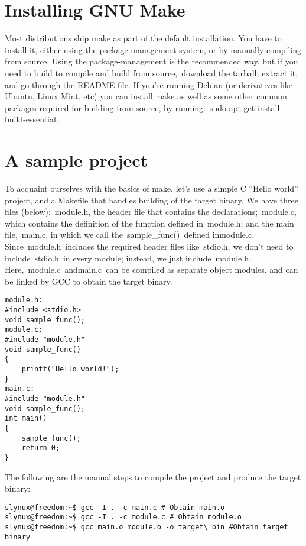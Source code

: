 \documentclass[output=paper, 
colorlinks,
citecolor=brown,
newtxmath
]{langscibook}
\begin{document}
\section {Installing GNU Make}

Most distributions ship make as part of the default installation. You have to install it, either using the package-management system, or by manually compiling from source. Using the package-management is the recommended way, but if you need to build to compile and build from source, download the tarball, extract it, and go through the README file. If you’re running Debian (or derivatives like Ubuntu, Linux Mint, etc) you can install make as well as some other common packages required for building from source, by running: sudo apt-get install build-essential.

\section {A sample project}

To acquaint ourselves with the basics of make, let’s use a simple C “Hello world” project, and a Makefile that handles building of the target binary. We have three files (below): module.h, the header file that contains the declarations; module.c, which contains the definition of the function defined in module.h; and the main file, main.c, in which we call the sample\_func() defined inmodule.c. Since module.h includes the required header files like stdio.h, we don’t need to include stdio.h in every module; instead, we just include module.h. Here, module.c andmain.c can be compiled as separate object modules, and can be linked by GCC to obtain the target binary.

\begin{verbatim}
module.h:
#include <stdio.h>
void sample_func();
module.c:
#include "module.h"
void sample_func()
{
    printf("Hello world!");
}
main.c:
#include "module.h"
void sample_func();
int main()
{
    sample_func();
    return 0;
}
\end{verbatim}

The following are the manual steps to compile the project and produce the target binary:

\begin{verbatim}
slynux@freedom:~$ gcc -I . -c main.c # Obtain main.o
slynux@freedom:~$ gcc -I . -c module.c # Obtain module.o
slynux@freedom:~$ gcc main.o module.o -o target\_bin #Obtain target binary
\end{verbatim}
\end{document}
